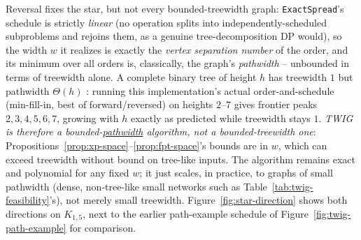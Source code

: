 \documentclass[ijoc,sglanonrev]{informs4}
\begin{document}
Reversal fixes the star, but not every bounded-treewidth graph:
\texttt{ExactSpread}'s schedule is strictly \emph{linear} (no operation
splits into independently-scheduled subproblems and rejoins them, as a
genuine tree-decomposition DP would), so the width $w$ it realizes is
exactly the \emph{vertex separation number} of the order, and its minimum
over all orders is, classically, the graph's \emph{pathwidth}
\citep{kinnersley1992} -- unbounded in terms of treewidth alone. A
complete binary tree of height $h$ has treewidth $1$ but pathwidth
$\Theta(h)$ \citep{kinnersley1992}: running this implementation's actual
order-and-schedule (min-fill-in, best of forward/reversed) on heights
$2$--$7$ gives frontier peaks $2,3,4,5,6,7$, growing with $h$ exactly as
predicted while treewidth stays $1$. \emph{TWIG is therefore a
bounded-\underline{pathwidth} algorithm, not a bounded-treewidth one}:
Propositions~\ref{prop:xp-space}--\ref{prop:fpt-space}'s bounds are in
$w$, which can exceed treewidth without bound on tree-like inputs. The
algorithm remains exact and polynomial for any fixed $w$; it just scales,
in practice, to graphs of small pathwidth (dense, non-tree-like small
networks such as Table~\ref{tab:twig-feasibility}'s), not merely small
treewidth.
Figure~\ref{fig:star-direction} shows both directions on $K_{1,5}$, next
to the earlier path-example schedule of Figure~\ref{fig:twig-path-example}
for comparison.
\end{document}
